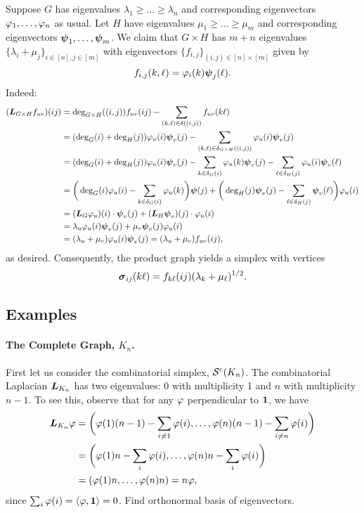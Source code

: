 Suppose $G$ has eigenvalues $\lambda_1\geq \dots\geq \lambda_{n}$ and corresponding eigenvectors $\varphi_1,\dots,\varphi_{n}$ as usual. Let $H$ have eigenvalues $\mu_1\geq \dots\geq \mu_{m}$ and corresponding eigenvectors $\vb*{\psi}_1,\dots,\vb*{\psi}_{m}$. 
We claim that $G\times H$ has $m+n$ eigenvalues $\{\lambda_i+\mu_j\}_{i\in[n],j\in[m]}$ with eigenvectors $\{f_{i,j}\}_{(i,j)\in[n]\times[m]}$ given by 
\[f_{i,j}(k,\ell) = \varphi_i(k)\vb*{\psi}_j(\ell).\]
Indeed: 
\begin{align*}
(\vb*{L}_{G\times H} f_{uv})(ij) &= \deg_{G\times H}((i,j))f_{uv}(ij) - \sum_{(k,\ell)\in \delta((i,j))} f_{uv}(k\ell) \\
&= (\deg_G(i)+\deg_H(j))\varphi_u(i)\vb*{\psi}_v(j) - \sum_{(k,\ell)\in \delta_{G\times H}((i,j))} \varphi_u(i)\vb*{\psi}_v(j) \\
&= (\deg_G(i)+\deg_H(j))\varphi_u(i)\vb*{\psi}_v(j) - \sum_{k\in \delta_G(i)} \varphi_u(k)\vb*{\psi}_v(j) - \sum_{\ell\in \delta_H(j)} \varphi_u(i)\vb*{\psi}_v(\ell) \\
&=\bigg(\deg_G(i)\varphi_u(i) - \sum_{k\in\delta_G(i)}\varphi_u(k)\bigg)\vb*{\psi}(j) + \bigg(\deg_H(j)\vb*{\psi}_v(j)-\sum_{\ell\in\delta_H(j)}\vb*{\psi}_v(\ell)\bigg)\varphi_u(i) \\
&= (\vb*{L}_G \varphi_u)(i) \cdot \vb*{\psi}_v(j) + (\vb*{L}_H\vb*{\psi}_v)(j)\cdot \varphi_u(i) \\
&= \lambda_u\varphi_u(i) \vb*{\psi}_v(j) + \mu_v\vb*{\psi}_v(j)\varphi_u(i) \\
&= (\lambda_u+\mu_v)\varphi_u(i)\vb*{\psi}_v(j) = (\lambda_u+\mu_v)f_{uv}(ij),
\end{align*}
as desired. Consequently, the product graph yields a simplex with vertices 
\[\vb*{\sigma}_{ij}(k\ell)=f_{k\ell}(ij)(\lambda_k+\mu_\ell)^{1/2}.\]


\subsection{Examples}

\paragraph{The Complete Graph, $K_n$.}
First let us consider the combinatorial simplex, $\mathcal{S}^{\textnormal{c}}(K_n)$.  The combinatorial Laplacian $\vb*{L}_{K_n}$ has two eigenvalues: 0 with multiplicity 1 and $n$ with multiplicity $n-1$. To see this, observe that for any $\varphi$ perpendicular to $\vb{1}$, we have 
\begin{align*}
\vb*{L}_{K_n}\varphi &= \bigg(\varphi(1)(n-1)-\sum_{i\neq 1}\varphi(i),\dots,\varphi(n)(n-1)-\sum_{i\neq n}\varphi(i)\bigg) \\
&= \bigg(\varphi(1)n - \sum_i \varphi(i), \dots,\varphi(n)n - \sum_i \varphi(i)\bigg) \\
&= (\varphi(1)n,\dots,\varphi(n)n) = n\varphi,
\end{align*}
since $\sum_i\varphi(i)=\langle \varphi,\vb{1}\rangle =0$. \TODO Find orthonormal basis of eigenvectors.


